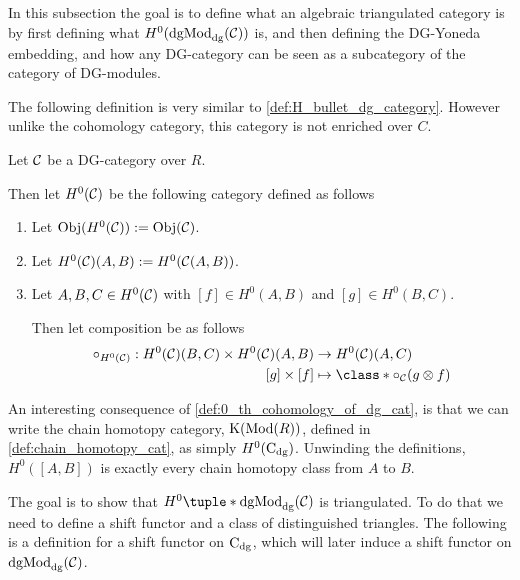 In this subsection the goal is to define what an algebraic triangulated category is by first defining what \( H^0(\operatorname{dgMod}_{\operatorname{dg}}({\mathcal{C}})) \) is, and then defining the DG-Yoneda embedding, and how any DG-category can be seen as a subcategory of the category of DG-modules.

The following definition is very similar to \autoref{def:H_bullet_dg_category}. However unlike the cohomology category, this category is not enriched over \( C \).

\begin{definition}
    \label{def:0_th_cohomology_of_dg_cat}
    Let \( {\mathcal{C}} \) be a DG-category over \( R \).

    Then let \( H^0({\mathcal{C}}) \) be the following category defined as follows
    \begin{enumerate}
        \item {
            Let \( \operatorname{Obj}(H^0({\mathcal{C}})) := \operatorname{Obj}({\mathcal{C}}) \).
        }
        \item {
            Let \( H^0({\mathcal{C}})(A, B) := H^0({\mathcal{C}}(A, B)) \).
        }
        \item {
            Let \( A, B, C \in H^0({\mathcal{C}}) \) with \( [f] \in H^0(A, B) \) and \( [g] \in H^0(B, C) \).

            Then let composition be as follows
            \begin{align*}
                \circ_{H^0(\Cc)}: H^0(\Cc)(B, C) \times H^0(\Cc)(A, B) &\to H^0(\Cc)(A, C) \\
                [g] \times [f] &\mapsto \class*{ \circ_{\Cc}(g \otimes f) }
            \end{align*}
        }
    \end{enumerate}
\end{definition}

An interesting consequence of \autoref{def:0_th_cohomology_of_dg_cat}, is that we can write the chain homotopy category, \( \operatorname{K}(\operatorname{Mod}(R)) \), defined in \autoref{def:chain_homotopy_cat}, as simply \( H^0(\operatorname{C}_{\operatorname{dg}}) \). Unwinding the definitions, \( H^0([A, B]) \) is exactly every chain homotopy class from \( A \) to \( B \).

The goal is to show that \( H^0\tuple*{\dgMod_{\dg}(\Cc)} \) is triangulated. To do that we need to define a shift functor and a class of distinguished triangles. The following is a definition for a shift functor on \( \operatorname{C}_{\operatorname{dg}} \), which will later induce a shift functor on \( \operatorname{dgMod}_{\operatorname{dg}}({\mathcal{C}}) \).

